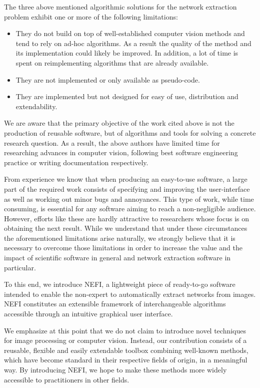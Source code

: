 	The three above mentioned algorithmic solutions for the network extraction problem exhibit one or more of the following	limitations: 

	\begin{itemize}
		\item They do not build on top of well-established computer vision methods and tend to rely on ad-hoc algorithms. As a result the quality of the method and its implementation could likely be improved. In addition, a lot of time is spent on reimplementing algorithms that are already available. 

		\item They are not implemented or only available as pseudo-code.

		\item They are implemented but not designed for easy of use, distribution and extendability.
	\end{itemize}

	We are aware that the primary objective of the work cited above is not the production of reusable software, but of algorithms and tools for solving a concrete research question.
	As a result, the above authors have limited time for researching advances in computer vision, following best software engineering practice or writing documentation respectively. 

	From experience we know that when producing an easy-to-use software, a large part of the required work consists of specifying and improving the user-interface as well as working out minor bugs and annoyances. This type of work, while time consuming, is essential for any software aiming to reach a non-negligible audience. However, efforts like these are hardly attractive to researchers whose focus is on obtaining the next result. While we understand that under these circumstances the aforementioned limitations arise naturally, we strongly believe that it is necessary to overcome those limitations in order to increase the value and the impact of scientific software in general and network extraction software in particular. 

	To this end, we introduce NEFI, a lightweight piece of ready-to-go software intended to enable the non-expert to automatically extract networks from images. NEFI constitutes an extensible framework of interchangeable algorithms accessible through an intuitive graphical user interface. 

	We emphasize at this point that we do not claim to introduce novel techniques for image processing or computer vision. Instead, our contribution consists of a reusable, flexible and easily extendable toolbox combining well-known methods, which have become standard in their respective fields of origin, in a meaningful way. By introducing NEFI, we hope to make these methods more widely accessible to practitioners in other fields.

